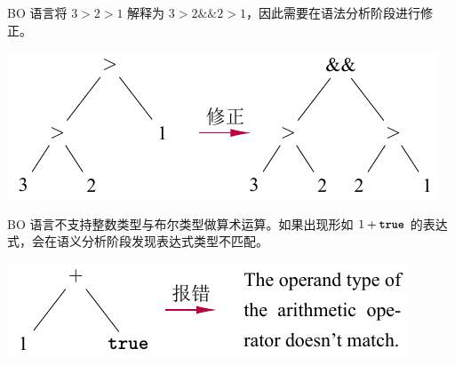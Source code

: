 \documentclass[dvipsnames, svgnames, x11names]{beamer}
\begin{document}
\begin{frame}
    BO 语言将 $3>2>1$ 解释为 $3>2\&\&2>1$，因此需要在语法分析阶段进行修正。

    \vspace{\baselineskip}
    \begin{center}
    \includegraphics{../figure/semantic1.pdf}
    \end{center}
    
\end{frame}

\begin{frame}
    BO 语言不支持整数类型与布尔类型做算术运算。如果出现形如 $1+\texttt{\bfseries true}$ 的表达式，会在语义分析阶段发现表达式类型不匹配。

    \vspace{\baselineskip}
    \begin{center}
    \includegraphics{../figure/semantic2.pdf}
    \end{center}
\end{frame}
\end{document}
